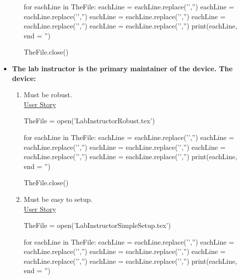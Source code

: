 \begin{itemize}
\begin{enumerate}
\begin{python}
for eachLine in TheFile:
    eachLine = eachLine.replace('','')
    eachLine = eachLine.replace('','')
    eachLine = eachLine.replace('','')
    eachLine = eachLine.replace('','')
    eachLine = eachLine.replace('','')
    print(eachLine, end = '')
		
TheFile.close()
\end{python}
\bigskip
		
		
	\end{enumerate}
	\item  {\textbf{The lab instructor is the primary maintainer of the device.  The device:}}
	\begin{enumerate}
		\item Must be robust.\\[.5cm] \underline{User Story}\\
\begin{python}
TheFile = open('LabInstructorRobust.tex')

for eachLine in TheFile:
    eachLine = eachLine.replace('','')
    eachLine = eachLine.replace('','')
    eachLine = eachLine.replace('','')
    eachLine = eachLine.replace('','')
    eachLine = eachLine.replace('','')
    print(eachLine, end = '')
		
TheFile.close()
\end{python}
\bigskip
		
		\item Must be easy to setup.\\[.5cm] \underline{User Story}\\
		
\begin{python}
TheFile = open('LabInstructorSimpleSetup.tex')

for eachLine in TheFile:
    eachLine = eachLine.replace('','')
    eachLine = eachLine.replace('','')
    eachLine = eachLine.replace('','')
    eachLine = eachLine.replace('','')
    eachLine = eachLine.replace('','')
    print(eachLine, end = '')
		

\end{python}
\end{enumerate}
\end{itemize}
